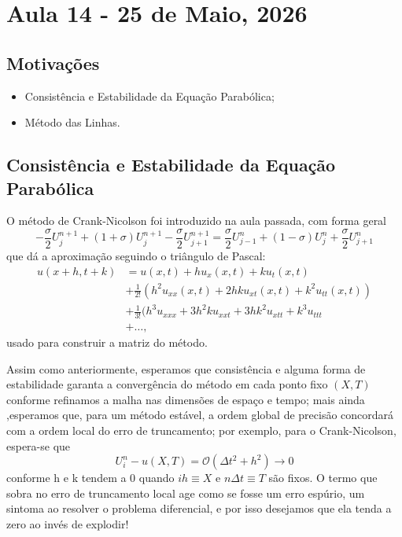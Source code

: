 \documentclass[../differential_methods.tex]{subfiles}
\begin{document}
\section{Aula 14 - 25 de Maio, 2026}
\subsection{Motivações}
\begin{itemize}
	\item Consistência e Estabilidade da Equação Parabólica;
	\item Método das Linhas.
\end{itemize}
\subsection{Consistência e Estabilidade da Equação Parabólica}
O método de Crank-Nicolson foi introduzido na aula passada, com forma geral
\[
	\boxed{-\frac{\sigma }{2}U_{j}^{n+1} + (1+\sigma )U_{j}^{n+1} -\frac{\sigma }{2}U_{j+1}^{n+1} = \frac{\sigma }{2}U_{j-1}^{n}+(1-\sigma )U_{j}^{n}+\frac{\sigma }{2}U_{j+1}^{n}}
\]
que dá a aproximação seguindo o triângulo de Pascal:
\begin{align*}
	u(x+h, t+k) & = u(x, t) + h u_{x}(x, t) + ku_{t}(x, t)                                 \\
	            & +\frac{1}{2!}(h^{2}u_{xx}(x, t)+2hku_{xt}(x, t) + k^{2}u_{tt}(x, t))     \\
	            & +\frac{1}{3!}(h^{3}u_{xxx}+3h^{2}ku_{xxt} + 3hk^{2}u_{xtt}+ k^{3}u_{ttt} \\
	            & + \dotsc,
\end{align*}
usado para construir a matriz do método.

Assim como anteriormente, esperamos que consistência e alguma forma de estabilidade garanta a convergência do método em cada ponto fixo \((X, T)\) conforme refinamos a malha nas dimensões de espaço e tempo; mais ainda ,esperamos que, para um método estável, a ordem global de precisão concordará com a ordem local do erro de truncamento; por exemplo, para o Crank-Nicolson, espera-se que
\[
	U_{i}^{n} - u(X, T) = \mathcal{O}(\Delta t^{2}+h^{2})\rightarrow 0
\]
conforme h e k tendem a 0 quando \(ih \equiv X\) e \(n\Delta t \equiv T\) são fixos. O termo que sobra no erro de truncamento local age como se fosse um erro espúrio, um sintoma ao resolver o problema diferencial, e por isso desejamos que ela tenda a zero ao invés de explodir!
\end{document}

